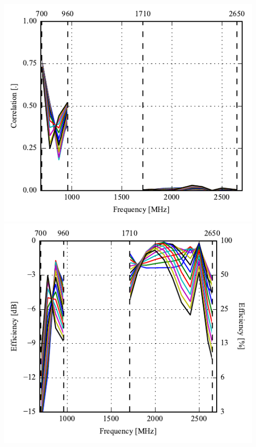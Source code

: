 \begin{frame}
\begin{minipage}[t]{0.49\linewidth}
    \includegraphics[width=0.78\linewidth]{img/henrik/mono/s22_corr} \\
    \includegraphics[width=0.82\linewidth]{img/henrik/mono/efficiency-ac2-csh2} 

  \end{minipage}    
\end{frame}



